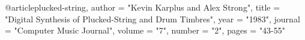 \documentclass{ucbthesis}
\theoremstyle{plain}
\theoremstyle{definition}
\newtheorem{data memo}[theorem]{Data Memo}
\begin{document}
\begin{frontmatter}



%
%
%
\end{frontmatter}
%





\def\Arccosh{{\rm Arccosh}}



@article{plucked-string,
	author =	"Kevin Karplus and Alex Strong",
	title =		"Digital Synthesis of Plucked-String and Drum Timbres",
	year =		"1983",
	journal =	"Computer Music Journal",
	volume =	"7",
	number =	"2",
	pages =		"43-55"
}
\end{document}
